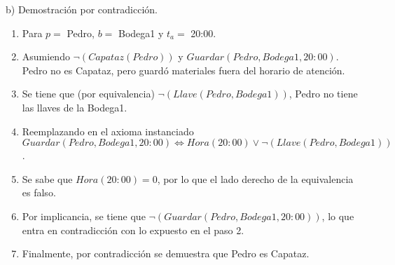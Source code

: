 \documentclass[11pt]{utalcaDoc}
\begin{document}
\begin{enumerate}
b) Demostración por contradicción.
\begin{enumerate}
\item Para $p = $ Pedro, $b = $ Bodega1 y $t_a = $ 20:00.
\item Asumiendo $\neg(Capataz(Pedro))$ y $Guardar(Pedro,Bodega1,20:00)$. Pedro no es Capataz, pero guardó materiales fuera del horario de atención.
\item Se tiene que (por equivalencia) $\neg (Llave(Pedro, Bodega1))$, Pedro no tiene las llaves de la Bodega1.
\item Reemplazando en el axioma instanciado \\ $Guardar(Pedro,Bodega1,20:00) \iff Hora(20:00) \lor \neg (Llave(Pedro, Bodega1)) $.
\item Se sabe que $Hora(20:00) = 0$, por lo que el lado derecho de la equivalencia es falso.
\item Por implicancia, se tiene que $\neg(Guardar(Pedro,Bodega1,20:00))$, lo que entra en contradicción con lo expuesto en el paso 2.
\item Finalmente, por contradicción se demuestra que Pedro es Capataz.
\end{enumerate}


\end{enumerate}

\newpage
\subsection{ } %
 
\newpage
\subsection{ } %
\end{document}
